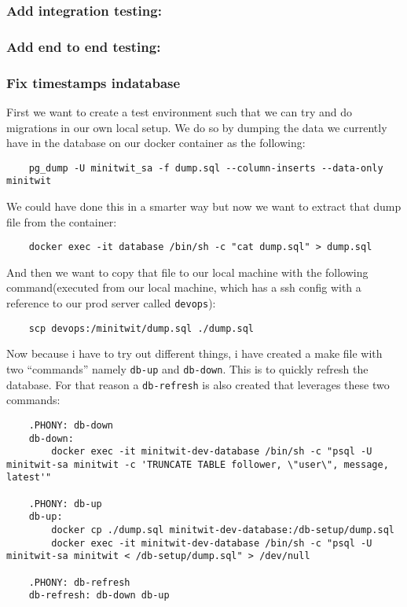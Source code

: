 \subsubsection{Add integration testing:}
\label{log:add-integration-testing}

\subsubsection{Add end to end testing:}
\label{log:add-end-to-end-testing}

\subsubsection{Fix timestamps indatabase}
\label{log:fix-timestamps-in-database}

First we want to create a test environment such that we can try and do migrations in our own local setup. We do so by dumping the data we currently have in the database on our docker container as the following:
\begin{verbatim}
    pg_dump -U minitwit_sa -f dump.sql --column-inserts --data-only minitwit
\end{verbatim}

We could have done this in a smarter way but now we want to extract that dump file from the container:

\begin{verbatim}
    docker exec -it database /bin/sh -c "cat dump.sql" > dump.sql
\end{verbatim}

And then we want to copy that file to our local machine with the following command(executed from our local machine, which has a ssh config with a reference to our prod server called \texttt{devops}):

\begin{verbatim}
    scp devops:/minitwit/dump.sql ./dump.sql
\end{verbatim}

Now because i have to try out different things, i have created a make file with two ``commands'' namely \texttt{db-up} and \texttt{db-down}. This is to quickly refresh the database. For that reason a \texttt{db-refresh} is also created that leverages these two commands:

\begin{verbatim}
    .PHONY: db-down
    db-down:
        docker exec -it minitwit-dev-database /bin/sh -c "psql -U minitwit-sa minitwit -c 'TRUNCATE TABLE follower, \"user\", message, latest'"

    .PHONY: db-up
    db-up:
        docker cp ./dump.sql minitwit-dev-database:/db-setup/dump.sql
        docker exec -it minitwit-dev-database /bin/sh -c "psql -U minitwit-sa minitwit < /db-setup/dump.sql" > /dev/null

    .PHONY: db-refresh
    db-refresh: db-down db-up

\end{verbatim}

